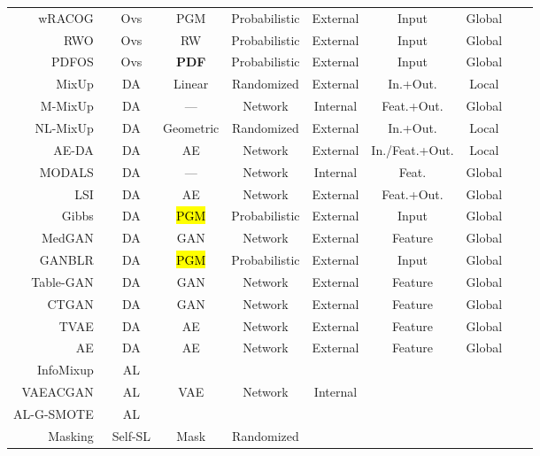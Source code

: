 \documentclass[parskip=full]{scrartcl}
\begin{document}
\begin{longtable}{rcccccccc}
    wRACOG~\cite{das2014racog} & Ovs & PGM & Probabilistic & External & Input & Global \\
    RWO~\cite{zhang2014rwo} & Ovs & RW & Probabilistic & External & Input & Global \\
    PDFOS~\cite{gao2014pdfos} & Ovs & \textbf{PDF} & Probabilistic & External & Input & Global \\
    MixUp~\cite{zhang2018mixup} & DA & Linear & Randomized & External & In.+Out. & Local \\
    M-MixUp~\cite{verma2019manifold} & DA & --- & Network & Internal & Feat.+Out. & Global \\
    NL-MixUp~\cite{guo2020nonlinear} & DA & Geometric & Randomized & External & In.+Out. & Local \\
    AE-DA~\cite{feng2020autuencoder} & DA & AE & Network & External & In./Feat.+Out. & Local \\
    MODALS~\cite{cheung2020modals} & DA & --- & Network & Internal & Feat. & Global \\
    LSI~\cite{liu2018data} & DA & AE & Network & External & Feat.+Out. & Global \\
    Gibbs~\cite{fakoor2020fast} & DA & \hl{PGM} & Probabilistic & External & Input & Global \\
    MedGAN~\cite{armanious2020medgan} & DA & GAN & Network & External & Feature & Global \\
    GANBLR~\cite{zhang2021ganblr} & DA & \hl{PGM} & Probabilistic & External & Input & Global \\
    Table-GAN~\cite{park2018data} & DA & GAN & Network & External & Feature & Global \\
    CTGAN~\cite{xu2019modeling} & DA & GAN & Network & External & Feature & Global \\
    TVAE~\cite{xu2019modeling} & DA & AE & Network & External & Feature & Global \\
    AE~\cite{delgado2021deep} & DA & AE & Network & External & Feature & Global \\
    InfoMixup~\cite{kim2021lada} & AL \\
    VAEACGAN~\cite{tran2019bayesian} & AL & VAE & Network & Internal \\
    AL-G-SMOTE~\cite{fonseca2021increasing} & AL \\
    Masking~\cite{yoon2020vime} & Self-SL & Mask & Randomized \\
\end{longtable}
\endgroup
\end{document}
